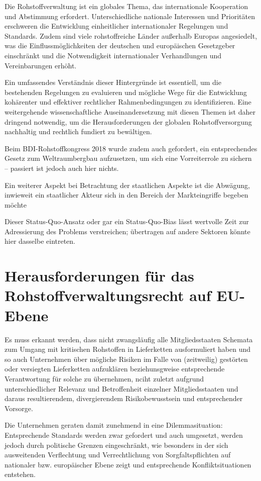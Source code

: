 \documentclass[12pt,a4paper,oneside]{book} %
\begin{document}
Die Rohstoffverwaltung ist ein globales Thema, das internationale Kooperation und Abstimmung erfordert. Unterschiedliche nationale Interessen und Prioritäten erschweren die Entwicklung einheitlicher internationaler Regelungen und Standards. Zudem sind viele rohstoffreiche Länder außerhalb Europas angesiedelt, was die Einflussmöglichkeiten der deutschen und europäischen Gesetzgeber einschränkt und die Notwendigkeit internationaler Verhandlungen und Vereinbarungen erhöht.

Ein umfassendes Verständnis dieser Hintergründe ist essentiell, um die bestehenden Regelungen zu evaluieren und mögliche Wege für die Entwicklung kohärenter und effektiver rechtlicher Rahmenbedingungen zu identifizieren. Eine weitergehende wissenschaftliche Auseinandersetzung mit diesen Themen ist daher dringend notwendig, um die Herausforderungen der globalen Rohstoffversorgung nachhaltig und rechtlich fundiert zu bewältigen.

Beim BDI-Rohstoffkongress 2018 wurde zudem auch gefordert, ein entsprechendes Gesetz zum Weltraumbergbau aufzusetzen, um sich eine Vorreiterrole zu sichern -- passiert ist jedoch auch hier nichts.


Ein weiterer Aspekt bei Betrachtung der staatlichen Aspekte ist die Abwägung, inwieweit ein staatlicher Akteur sich in den Bereich der Markteingriffe begeben möchte

Dieser Status-Quo-Ansatz oder gar ein Status-Quo-Bias lässt wertvolle Zeit zur Adressierung des Problems verstreichen; übertragen auf andere Sektoren könnte hier dasselbe eintreten.


\section{Herausforderungen für das Rohstoffverwaltungsrecht auf EU-Ebene}
Es muss erkannt werden, dass nicht zwangsläufig alle Mitgliedsstaaten Schemata zum Umgang mit kritischen Rohstoffen in Lieferketten ausformuliert haben und so auch Unternehmen über mögliche Risiken im Falle von (zeitweilig) gestörten oder versiegten Lieferketten aufzuklären beziehunsgweise entsprechende Verantwortung für solche zu übernehmen, nciht zuletzt aufgrund unterschiedlicher Relevanz und Betroffenheit einzelner Mitgliedsstaaten und daraus resultierendem, divergierendem Risikobewusstsein und entsprechender Vorsorge.

Die Unternehmen geraten damit zunehmend in eine Dilemmasituation: Entsprechende Standards werden zwar gefordert und auch umgesetzt, werden jedoch durch politische Grenzen eingeschränkt, wie besonders in der sich ausweitenden Verflechtung und Verrechtlichung von Sorgfaltspflichten auf nationaler bzw. europäischer Ebene zeigt und entsprechende Konfliktsituationen entstehen.
\end{document}
